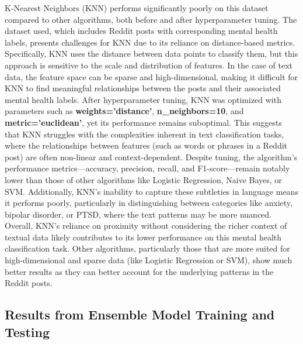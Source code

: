 \noindent 
K-Nearest Neighbors (KNN) performs significantly poorly on this dataset compared to other algorithms, both before and after hyperparameter tuning. The dataset used, which includes Reddit posts with corresponding mental health labels, presents challenges for KNN due to its reliance on distance-based metrics. Specifically, KNN uses the distance between data points to classify them, but this approach is sensitive to the scale and distribution of features. In the case of text data, the feature space can be sparse and high-dimensional, making it difficult for KNN to find meaningful relationships between the posts and their associated mental health labels. After hyperparameter tuning, KNN was optimized with parameters such as \textbf{weights='distance'}, \textbf{n\_neighbors=10}, and \textbf{metric='euclidean'}, yet its performance remains suboptimal. This suggests that KNN struggles with the complexities inherent in text classification tasks, where the relationships between features (such as words or phrases in a Reddit post) are often non-linear and context-dependent. Despite tuning, the algorithm's performance metrics—accuracy, precision, recall, and F1-score—remain notably lower than those of other algorithms like Logistic Regression, Naive Bayes, or SVM. Additionally, KNN's inability to capture these subtleties in language means it performs poorly, particularly in distinguishing between categories like anxiety, bipolar disorder, or PTSD, where the text patterns may be more nuanced. Overall, KNN's reliance on proximity without considering the richer context of textual data likely contributes to its lower performance on this mental health classification task. Other algorithms, particularly those that are more suited for high-dimensional and sparse data (like Logistic Regression or SVM), show much better results as they can better account for the underlying patterns in the Reddit posts.

\pagebreak

\subsection{Results from Ensemble Model Training and Testing}
